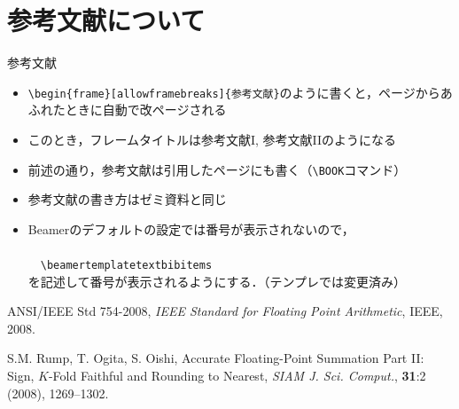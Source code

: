 \documentclass[dvipdfmx,cjk]{beamer}
\newcommand{\BOOK}[2]{%
	\renewcommand\thefootnote{}%
	\renewcommand{\arraystretch}{0.5}
	\onslide\footnotetext{
		\vspace{-1.2em}
		{\tiny\begin{tabular}{p{.025\hsize}p{.88\hsize}}
			\hspace{-.5em}
			#1$\!$&$\!$#2
		\end{tabular}}
	}%
	\renewcommand{\arraystretch}{1.2}
	\renewcommand\thefootnote{*\arabic{footnote}}%
}
\begin{document}
\section{参考文献について}
\begin{frame}[containsverbatim]{参考文献}
\begin{itemize}
\item \verb|\begin{frame}[allowframebreaks]{参考文献}|のように書くと，ページからあふれたときに自動で改ページされる

\item このとき，フレームタイトルは参考文献I, 参考文献IIのようになる

\item 前述の通り，参考文献は引用したページにも書く（\verb|\BOOK|コマンド）

\item 参考文献の書き方はゼミ資料と同じ

\item Beamerのデフォルトの設定では番号が表示されないので，\\
　\verb||\\
　\verb|\beamertemplatetextbibitems|\\
を記述して番号が表示されるようにする．（テンプレでは変更済み）
\end{itemize}
	
\begin{thebibliography}{99}\footnotesize

\beamertemplatetextbibitems

ANSI/IEEE Std 754-2008, 
\textit{IEEE Standard for Floating Point Arithmetic}, 
IEEE, 2008.

S.M. Rump, T. Ogita, S. Oishi, 
Accurate Floating-Point Summation Part II: Sign, $K$-Fold Faithful and Rounding to Nearest, 
\textit{SIAM J. Sci. Comput.}, \textbf{31}:2 (2008), 1269--1302.
\end{thebibliography}

\end{frame}
\end{document}
